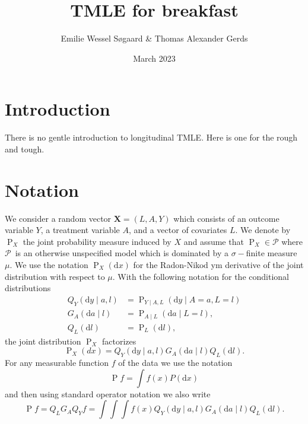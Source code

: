 \documentclass{article}
\title{TMLE for breakfast}
\author{Emilie Wessel S{\o}gaard \& Thomas Alexander Gerds}
\date{March 2023}
\newcommand{\X}[1]{X(#1)}
\newcommand{\modelx}{\ensuremath{\mathcal{P}}}
\newcommand{\distx}{\ensuremath{\P_{X}}}
\renewcommand{\X}{\ensuremath{\mathbf{X}}}
\renewcommand{\P}{\ensuremath{\operatorname{P}}}
\renewcommand{\d}{\ensuremath{\mathrm{d}}}
\begin{document}
\maketitle

\section{Introduction}

There is no gentle introduction to longitudinal TMLE. Here is one for the rough and tough.

\section{Notation}

We consider a random vector $\X=(L,A,Y)$ which consists of an outcome
variable \(Y\), a treatment variable \(A\), and a vector of covariates
\(L\). We denote by \(\distx\) the joint probability measure induced
by \(X\) and assume that $\P_X\in\modelx $ where \modelx\ is an
otherwise unspecified model which is dominated by a \(\sigma-\)finite
measure $\mu$. We use the notation \(\P_X(\d x)\) for the Radon-Niko\d
ym derivative of the joint distribution with respect to \(\mu\). With
the following notation for the conditional distributions
\begin{align*}
    Q_Y(\d y\mid a,l)&=\P_{Y\mid A, L}(\d y\mid A=a, L = l)\\
    G_A(\d a\mid l)&=\P_{A\mid L}(\d a\mid L = l),\\
    Q_L(\d l)&=\P_L(\d l),
\end{align*}
the joint distribution $\distx$ factorizes
\begin{equation*}\distx(dx)=Q_Y(\d y\mid a,l)G_A(\d a\mid l)Q_L(\d l).\end{equation*}
For any measurable function \(f\) of the data we use the notation
\begin{equation*}
\P f=\int f(x)P(\d x)
\end{equation*}
and then using standard operator notation we also write 
\begin{equation*}
\P f=Q_LG_AQ_Yf=\int\int\int f(x)Q_Y(\d y\mid a,l)G_A(\d a\mid l)Q_L(\d l).
\end{equation*}
\end{document}
